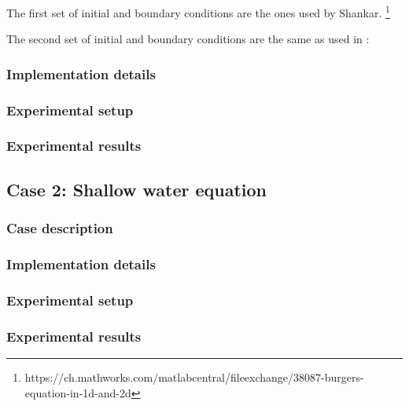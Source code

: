 The first set of initial and boundary conditions are the ones used by Shankar. \footnote{https://ch.mathworks.com/matlabcentral/fileexchange/38087-burgers-equation-in-1d-and-2d}

The second set of initial and boundary conditions are the same as used in \citet{zhao2011new}:

\subsubsection{Implementation details}

\subsubsection{Experimental setup}

\subsubsection{Experimental results}


\subsection{Case 2: Shallow water equation}

\subsubsection{Case description}

\subsubsection{Implementation details}

\subsubsection{Experimental setup}

\subsubsection{Experimental results}
